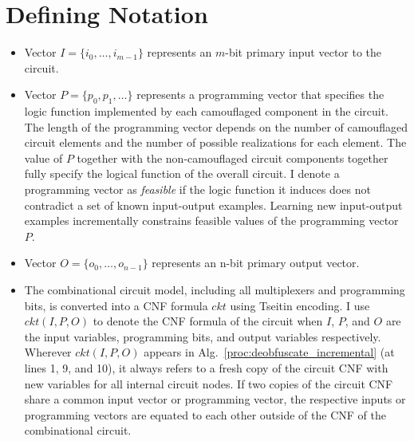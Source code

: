 \documentclass[proposal]{umassthesis}  %
\begin{document}
\section{Defining Notation}
\begin{itemize}

\item Vector $I=\{i_0,\dots, i_{m-1}\}$ represents an $m$-bit primary input vector to the circuit.%

\item Vector $P=\{  p_{0}, p_{1}, \dots \}$ represents a programming vector that specifies the logic function implemented by each camouflaged component in the circuit. The length of the programming vector depends on the number of camouflaged circuit elements and the number of possible realizations for each element. The value of $P$ together with the non-camouflaged circuit components together fully specify the logical function of the overall circuit. I denote a programming vector as \textit{feasible} if the logic function it induces does not contradict a set of known input-output examples. Learning new input-output examples incrementally constrains feasible values of the programming vector $P$.

\item Vector $O=\{o_0,\dots,o_{n-1}\}$ represents an n-bit primary output vector. %

\item The combinational circuit model, including all multiplexers and programming bits, is converted into a CNF formula $ckt$ using Tseitin encoding. I use $ckt(I,P,O)$ to denote the CNF formula of the circuit when $I$, $P$, and $O$ are the input variables, programming bits, and output variables respectively. Wherever $ckt(I,P,O)$ appears in Alg.~\ref{proc:deobfuscate_incremental} (at lines 1, 9, and 10), it always refers to a fresh copy of the circuit CNF with new variables for all internal circuit nodes. If two copies of the circuit CNF share a common input vector or programming vector, the respective inputs or programming vectors are equated to each other outside of the CNF of the combinational circuit. %


\end{itemize}
\end{document}
